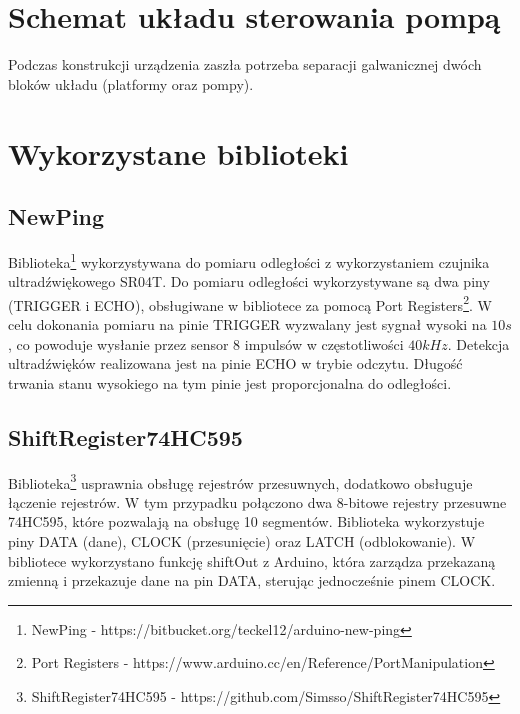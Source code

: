 \documentclass[11pt]{article}
\begin{document}
\section{Schemat układu sterowania pompą}
Podczas konstrukcji urządzenia zaszła potrzeba separacji galwanicznej dwóch bloków układu (platformy oraz pompy).\\
\begin{adjustbox}{width=320,center}
\noindent{}
\end{adjustbox}

\section{Wykorzystane biblioteki}
\subsection{NewPing}
Biblioteka\footnote{NewPing - https://bitbucket.org/teckel12/arduino-new-ping} wykorzystywana do pomiaru odległości z wykorzystaniem czujnika ultradźwiękowego SR04T. Do pomiaru odległości wykorzystywane są dwa piny (TRIGGER i ECHO), obsługiwane w bibliotece za pomocą Port Registers\footnote{Port Registers - https://www.arduino.cc/en/Reference/PortManipulation}. W celu dokonania pomiaru na pinie TRIGGER wyzwalany jest sygnał wysoki na $10$\si\micro$s$, co powoduje wysłanie przez sensor 8 impulsów w częstotliwości $40kHz$. Detekcja ultradźwięków realizowana jest na pinie ECHO w trybie odczytu. Długość trwania stanu wysokiego na tym pinie jest proporcjonalna do odległości.

\subsection{ShiftRegister74HC595}
Biblioteka\footnote{ShiftRegister74HC595 - https://github.com/Simsso/ShiftRegister74HC595} usprawnia obsługę rejestrów przesuwnych, dodatkowo obsługuje łączenie rejestrów. W tym przypadku połączono dwa 8-bitowe rejestry przesuwne 74HC595, które pozwalają na obsługę 10 segmentów. Biblioteka wykorzystuje piny DATA (dane), CLOCK (przesunięcie) oraz LATCH (odblokowanie). W bibliotece wykorzystano funkcję shiftOut z Arduino, która zarządza przekazaną zmienną i przekazuje dane na pin DATA, sterując jednocześnie pinem CLOCK.
\end{document}
